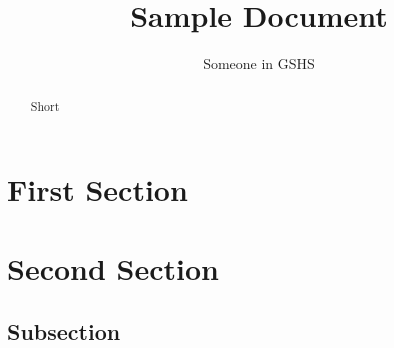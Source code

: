 \documentclass{article}
\title{Sample Document}
\author{Someone in GSHS}
\begin{document}
	
	\maketitle
	\tableofcontents
	
	\begin{abstract}
		Short
	\end{abstract}
	
	\section{First Section}
	
	\section{Second Section}
	\subsection{Subsection}
	
\end{document}
